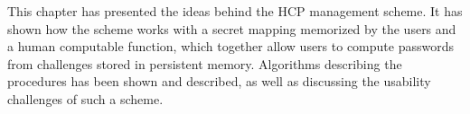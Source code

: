 \par This chapter has presented the ideas behind the HCP management scheme. It has shown how the scheme works with a secret mapping memorized by the users and a human computable function, which together allow users to compute passwords from challenges stored in persistent memory. Algorithms describing the procedures has been shown and described, as well as discussing the usability challenges of such a scheme.
